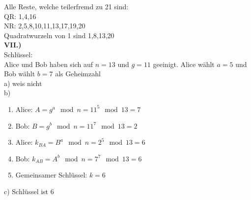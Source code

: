 \documentclass[12pt]{scrartcl}
\begin{document}
Alle Reste, welche teilerfremd zu 21 sind:\\
QR: 1,4,16\\
NR: 2,5,8,10,11,13,17,19,20\\

Quadratwurzeln von 1 sind 1,8,13,20\\

\vspace{1.5cm}
\textbf{VII.)}\\
Schlüssel:\\
Alice und Bob haben sich auf $n=13$ und $g=11$ geeinigt. Alice wählt $a=5$ und Bob wählt $b=7$ als 
Geheimzahl\\

a) weis nicht\\

b)
\begin{enumerate}
    \item Alice: $A = g^a \mod n = 11^5 \mod 13 = 7$
    \item Bob: $B = g^b \mod n = 11^7 \mod 13 = 2$
    \item Alice: $k_{BA} = B^a \mod n = 2^5 \mod 13 = 6$
    \item Bob: $k_{AB} = A^b \mod n = 7^7 \mod 13 = 6$
    \item Gemeinsamer Schlüssel: $k = 6$\\
\end{enumerate}

c) Schlüssel ist 6\\





\end{document}
